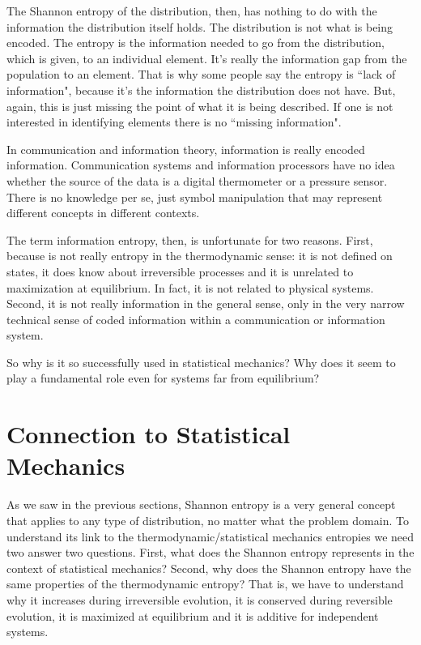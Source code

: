 \documentclass{article}
\begin{document}
The Shannon entropy of the distribution, then, has nothing to do with the information the distribution itself holds. The distribution is not what is being encoded. The entropy is the information needed to go from the distribution, which is given, to an individual element. It's really the information gap from the population to an element. That is why some people say the entropy is ``lack of information", because it's the information the distribution does not have. But, again, this is just missing the point of what it is being described. If one is not interested in identifying elements there is no ``missing information".

In communication and information theory, information is really encoded information. Communication systems and information processors have no idea whether the source of the data is a digital thermometer or a pressure sensor. There is no knowledge per se, just symbol manipulation that may represent different concepts in different contexts.

The term information entropy, then, is unfortunate for two reasons. First, because is not really entropy in the thermodynamic sense: it is not defined on states, it does know about irreversible processes and it is unrelated to maximization at equilibrium. In fact, it is not related to physical systems. Second, it is not really information in the general sense, only in the very narrow technical sense of coded information within a communication or information system.

So why is it so successfully used in statistical mechanics? Why does it seem to play a fundamental role even for systems far from equilibrium?

\section{Connection to Statistical Mechanics\label{csm}}

As we saw in the previous sections, Shannon entropy is a very general concept that applies to any type of distribution, no matter what the problem domain. To understand its link to the thermodynamic/statistical mechanics entropies we need two answer two questions. First, what does the Shannon entropy represents in the context of statistical mechanics? Second, why does the Shannon entropy have the same properties of the thermodynamic entropy? That is, we have to understand why it increases during irreversible evolution, it is conserved during reversible evolution, it is maximized at equilibrium and it is additive for independent systems.
\end{document}
